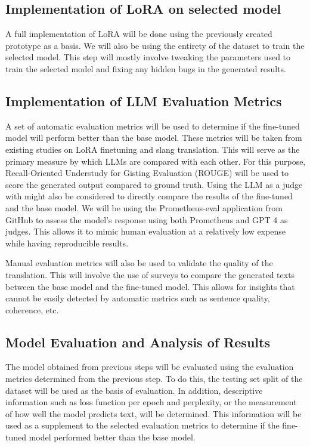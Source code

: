 \subsection{Implementation of LoRA on selected model}
A full implementation of LoRA will be done using the previously created prototype as a basis.
We will also be using the entirety of the dataset to train the selected model.
This step will mostly involve tweaking the parameters used to train the selected model and fixing any hidden bugs in the generated results.

\subsection{Implementation of LLM Evaluation Metrics}
A set of automatic evaluation metrics will be used to determine if the fine-tuned model will perform better than the base model.
These metrics will be taken from existing studies on LoRA finetuning and slang translation.
This will serve as the primary measure by which LLMs are compared with each other.
For this purpose, Recall-Oriented Understudy for Gisting Evaluation (ROUGE) will be used to score the generated output compared to ground truth.
Using the LLM as a judge with might also be considered to directly compare the results of the fine-tuned and the base model.
We will be using the Prometheus-eval application from GitHub to assess the model's response using both Prometheus and GPT 4 as judges.
This allows it to mimic human evaluation at a relatively low expense while having reproducible results.

Manual evaluation metrics will also be used to validate the quality of the translation.
This will involve the use of surveys to compare the generated texts between the base model and the fine-tuned model.
This allows for insights that cannot be easily detected by automatic metrics such as sentence quality, coherence, etc.

\subsection{Model Evaluation and Analysis of Results}
The model obtained from previous steps will be evaluated using the evaluation metrics determined from the previous step.
To do this, the testing set split of the dataset will be used as the basis of evaluation.
In addition, descriptive information such as loss function per epoch and perplexity, or the measurement of how well the model predicts text, will be determined.
This information will be used as a supplement to the selected evaluation metrics to determine if the fine-tuned model performed better than the base model.

